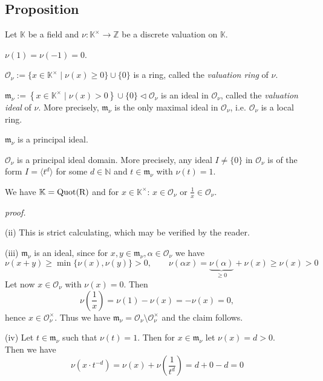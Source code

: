 \documentclass[12pt]{book}
\begin{document}
\begin{spacing}{1.3}
\subsection{Proposition} %
Let $\mathbb{K}$ be a field and $\nu:\mathbb{K}^{\times} \longrightarrow \mathbb{Z}$ be a discrete valuation on $\mathbb{K}$.
\begin{compactenum}
\item $\nu(1)=\nu(-1)=0$.
\item $\mathcal{O}_{\nu}:= \{ x \in \mathbb{K}^{\times} \mid \nu(x) \geqslant 0\} \cup \{0\}$ is a ring, called the \textit{valuation ring} of $\nu$. 
\item $\mathfrak{m}_{\nu}:= \left\{x \in \mathbb{K}^{\times} \mid \nu(x) > 0 \right\} \cup \{0\} \triangleleft \mathcal{O}_{\nu}$ is an ideal in $\mathcal{O}_{\nu}$, called the \textit{valuation ideal} of $\nu$. More precisely, $\mathfrak{m}_{\nu}$ is the only maximal ideal in $\mathcal{O}_{\nu}$, i.e. $\mathcal{O}_{\nu}$ is a local ring.
\item $\mathfrak{m}_{\nu}$ is a principal ideal.
\item $\mathcal{O}_{\nu}$ is a principal ideal domain. More precisely, any ideal $I \neq \{0\}$ in $\mathcal{O}_{\nu}$ is of the form $I=\langle t^d \rangle$ for some $d \in \mathbb{N}$ and $t \in \mathfrak{m}_{\nu}$ with $\nu(t)=1$.
\item We have $\mathbb{K}=\rm{Quot}(R)$ and for $x \in \mathbb{K}^{\times}$: $x \in \mathcal{O}_{\nu}$ or $\frac{1}{x} \in \mathcal{O}_{\nu}$.
\end{compactenum}
\textit{proof.}
\begin{compactenum}
\item[(ii)] This is strict calculating, which may be verified by the reader.
\item[(iii)] $\mathfrak{m}_{\nu}$ is an ideal, since for $x,y \in \mathfrak{m}_{\nu}, \alpha \in \mathcal{O}_{\nu}$ we have
$$\nu(x+y) \geqslant \min\{\nu(x), \nu(y) \}>0, \qquad \nu(\alpha x)= \underbrace{\nu(\alpha)}_{\geqslant 0}+\nu(x) \geqslant \nu(x) >0$$
Let now $x \in \mathcal{O}_{\nu}$ with $\nu(x)=0$. Then $$\nu\left(\frac{1}{x}\right)= \nu(1)-\nu(x)=-\nu(x)=0,$$hence $x \in \mathcal{O}_{\nu}^{\times}$.
Thus we have $\mathfrak{m}_{\nu}=\mathcal{O}_{\nu} \setminus \mathcal{O}_{\nu}^{\times}$ and the claim follows.
\item[(iv)] Let $t \in \mathfrak{m}_{\nu}$ such that $\nu(t)=1$. Then for $x \in \mathfrak{m}_{\nu}$ let $\nu(x)=d>0$. \\
Then we have $$\nu\left(x \cdot t^{-d}\right)=\nu(x)+\nu\left(\frac{1}{t^d}\right)=d+0-d=0$$

\end{compactenum}
\end{spacing}
\end{document}
